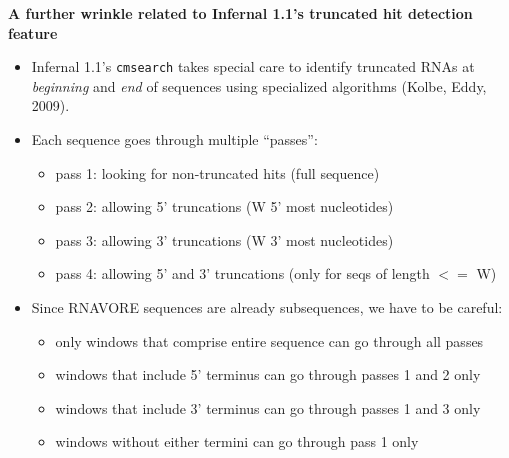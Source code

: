 \documentclass[landscape]{slides}
\begin{document}
\begin{slide}
\begin{center}
\small
\textbf{A further wrinkle related to Infernal 1.1's truncated hit
  detection feature}
\end{center}

\small
\begin{itemize}
\item Infernal 1.1's \texttt{cmsearch} takes special care to identify
  truncated RNAs at \emph{beginning} and \emph{end} of sequences using specialized
  algorithms (Kolbe, Eddy, 2009).
\item Each sequence goes through multiple ``passes'': 
  \begin {itemize}
  \item pass 1: looking for non-truncated hits (full sequence)
  \item pass 2: allowing 5' truncations (W 5' most nucleotides)
  \item pass 3: allowing 3' truncations (W 3' most nucleotides)
  \item pass 4: allowing 5' and 3' truncations (only for seqs of
    length $<=$ W)
  \end{itemize}
\item Since RNAVORE sequences are already subsequences, we have to be
  careful:
  \begin{itemize}
  \item only windows that comprise entire sequence can go through all
    passes
  \item windows that include 5' terminus can go through passes 1 and 2 only
  \item windows that include 3' terminus can go through passes 1 and 3 only
  \item windows without either termini can go through pass 1 only
  \end{itemize}
\end{itemize}

\vfill
\end{slide}
\end{document}
